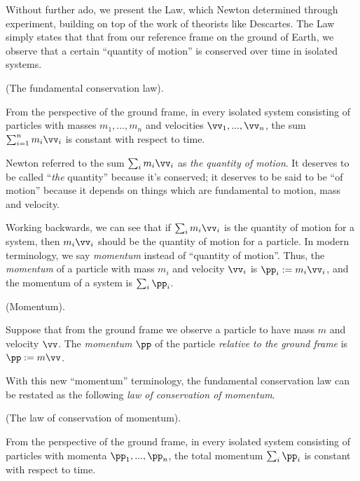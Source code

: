 \documentclass{article}
\begin{document}
Without further ado, we present the Law, which Newton determined through experiment, building on top of the work of theorists like Descartes. The Law simply states that that from our reference frame on the ground of Earth, we observe that a certain ``quantity of motion'' is conserved over time in isolated systems.

\begin{axiom}
	(The fundamental conservation law).
	
	From the perspective of the ground frame, in every isolated system consisting of particles with masses $m_1, ..., m_n$ and velocities $\vv_1, ..., \vv_n$, the sum $\sum_{i = 1}^n m_i \vv_i$ is constant with respect to time.
\end{axiom}

Newton referred to the sum $\sum_i m_i \vv_i$ as \textit{the quantity of motion}. It deserves to be called ``\textit{the} quantity'' because it's conserved; it deserves to be said to be ``of motion'' because it depends on things which are fundamental to motion, mass and velocity.

Working backwards, we can see that if $\sum_i m_i \vv_i$ is the quantity of motion for a system, then $m_i \vv_i$ should be the quantity of motion for a particle. In modern terminology, we say \textit{momentum} instead of ``quantity of motion''. Thus, the \textit{momentum} of a particle with mass $m_i$ and velocity $\vv_i$ is $\pp_i := m_i \vv_i$, and the momentum of a system is $\sum_i \pp_i$.

\begin{defn}
	(Momentum).
	
	Suppose that from the ground frame we observe a particle to have mass $m$ and velocity $\vv$. The \textit{momentum} $\pp$ of the particle \textit{relative to the ground frame} is $\pp := m \vv$.
\end{defn}

With this new ``momentum'' terminology, the fundamental conservation law can be restated as the following \textit{law of conservation of momentum}.

\begin{axiom}
	\label{N2_axiomatic_part_system_in_terms_of_momentum}
	(The law of conservation of momentum).
	
	From the perspective of the ground frame, in every isolated system consisting of particles with momenta $\pp_1, ..., \pp_n$, the total momentum $\sum_i \pp_i$ is constant with respect to time.
\end{axiom}
\end{document}
